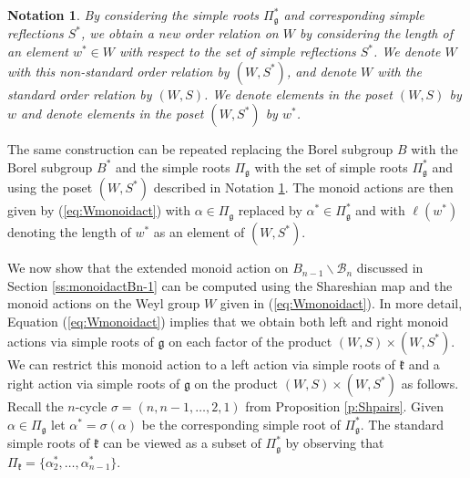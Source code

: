 \documentclass[12pt]{amsart}
\numberwithin{equation}{section}
\newtheorem{nota}[thm]{Notation}
\newcommand{\fk}{\mbox{${\mathfrak k}$}}
\newcommand{\fg}{\mbox{${\mathfrak g}$}}
\newcommand{\B}{\mathcal{B}}
\newcommand{\Borbitspace}{B_{n-1}\backslash\B_{n}}
\begin{document}
\begin{nota}\label{nota:Worders}
By considering the simple roots $\Pi_{\fg}^{*}$ and corresponding simple reflections $S^{*}$, we obtain a new order relation on $W$ by considering the length of an element $w^{*}\in W$ with respect to the set of simple reflections $S^{*}$.  We denote $W$ with this non-standard order relation by $(W, S^{*})$, and denote $W$ with the standard order relation by $(W, S)$.  We denote elements in the poset $(W,S)$ by $w$ and denote elements in the poset $(W, S^{*})$ by $w^{*}$.
\end{nota}

The same construction can be repeated replacing the Borel subgroup $B$ with
the Borel subgroup $B^{*}$ and the simple roots $\Pi_{\fg}$ with the set of simple roots $\Pi_{\fg}^{*}$ and using the poset $(W, S^{*})$ described in Notation \ref{nota:Worders}.  The monoid actions are then given by (\ref{eq:Wmonoidact}) with $\alpha\in\Pi_{\fg}$ replaced by $\alpha^{*}\in\Pi_{\fg}^{*}$ and with $\ell(w^{*})$ denoting the length of $w^{*}$ as an element of $(W,S^{*})$.  

We now show that the extended monoid action on $\Borbitspace$ discussed in Section \ref{ss:monoidactBn-1} can be computed using the Shareshian map and the monoid actions on the Weyl group $W$ given in (\ref{eq:Wmonoidact}).  
In more detail, Equation (\ref{eq:Wmonoidact}) implies that we obtain both left and right monoid actions via simple roots of $\fg$ on each factor of the product $(W,S)\times (W,S^{*})$.  We can restrict this monoid action to a left action via simple roots of $\fk$ and a right action via simple roots of $\fg$ on the product $(W,S)\times (W,S^{*})$ as follows.  Recall the $n$-cycle $\sigma=(n,n-1,\dots, 2, 1)$ from Proposition \ref{p:Shpairs}.  Given $\alpha\in\Pi_{\fg}$ let $\alpha^* = \sigma(\alpha)$ be the corresponding simple root of $\Pi_{\fg}^{*}$.   The standard simple roots of $\fk$ can be viewed as a subset of $\Pi_{\fg}^{*}$ by observing that $\Pi_{\fk}=\{\alpha_{2}^{*},\dots, \alpha_{n-1}^{*}\}$.

\end{document}
